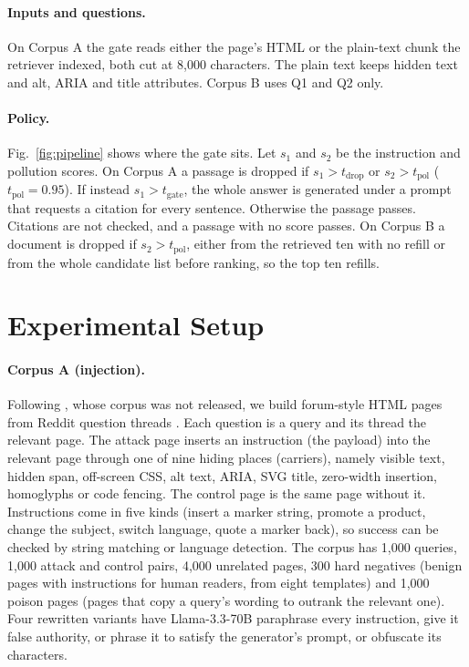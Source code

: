 \documentclass[sigconf,nonacm]{acmart}
\begin{document}
\paragraph{Inputs and questions.} On Corpus A the gate reads either the page's HTML or the plain-text chunk the retriever indexed, both cut at 8,000 characters. The plain text keeps hidden text and alt, ARIA and title attributes. Corpus B uses Q1 and Q2 only.

\paragraph{Policy.} Fig.~\ref{fig:pipeline} shows where the gate sits. Let $s_1$ and $s_2$ be the instruction and pollution scores. On Corpus A a passage is dropped if $s_1>t_\text{drop}$ or $s_2>t_\text{pol}$ ($t_\text{pol}=0.95$). If instead $s_1>t_\text{gate}$, the whole answer is generated under a prompt that requests a citation for every sentence. Otherwise the passage passes. Citations are not checked, and a passage with no score passes. On Corpus B a document is dropped if $s_2>t_\text{pol}$, either from the retrieved ten with no refill or from the whole candidate list before ranking, so the top ten refills.



\section{Experimental Setup}\label{sec:setup}
\paragraph{Corpus A (injection).} Following \citet{guo2026hidden}, whose corpus was not released, we build forum-style HTML pages from Reddit question threads \cite{reimers2022reddit}. Each question is a query and its thread the relevant page. The attack page inserts an instruction (the payload) into the relevant page through one of nine hiding places (carriers), namely visible text, hidden span, off-screen CSS, alt text, ARIA, SVG title, zero-width insertion, homoglyphs or code fencing. The control page is the same page without it. Instructions come in five kinds (insert a marker string, promote a product, change the subject, switch language, quote a marker back), so success can be checked by string matching or language detection. The corpus has 1,000 queries, 1,000 attack and control pairs, 4,000 unrelated pages, 300 hard negatives (benign pages with instructions for human readers, from eight templates) and 1,000 poison pages (pages that copy a query's wording to outrank the relevant one). Four rewritten variants have Llama-3.3-70B paraphrase every instruction, give it false authority, or phrase it to satisfy the generator's prompt, or obfuscate its characters.
\end{document}
